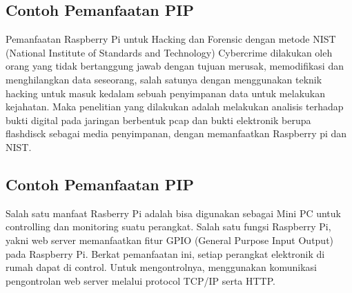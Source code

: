 \documentclass[12pt,a4paper]{article}
\begin{document}
\subsection{Contoh Pemanfaatan PIP}
Pemanfaatan Raspberry Pi untuk Hacking dan Forensic dengan metode NIST (National Institute of Standards and Technology)
Cybercrime dilakukan oleh orang yang tidak bertanggung jawab dengan tujuan merusak, memodifikasi dan menghilangkan data seseorang, salah satunya dengan menggunakan teknik hacking untuk masuk kedalam sebuah penyimpanan data untuk melakukan kejahatan.  Maka penelitian yang dilakukan adalah melakukan analisis terhadap bukti digital pada jaringan berbentuk pcap dan bukti elektronik berupa flashdisck sebagai media penyimpanan, dengan memanfaatkan Raspberry pi dan NIST.
\subsection{Contoh Pemanfaatan PIP}
Salah satu manfaat Rasberry Pi adalah bisa digunakan sebagai Mini PC untuk controlling dan monitoring suatu perangkat. Salah satu fungsi Raspberry Pi, yakni web server memanfaatkan fitur GPIO (General Purpose Input Output) pada Raspberry Pi. Berkat pemanfaatan ini, setiap perangkat elektronik di rumah dapat di control. Untuk mengontrolnya, menggunakan komunikasi pengontrolan web server melalui protocol TCP/IP serta HTTP.
\end{document}
